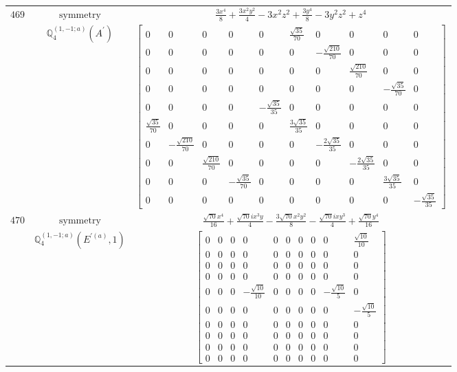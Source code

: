 \documentclass[fleqn,8pt,landscape]{jsarticle}
\begin{document}
\begin{longtable}{ccc}
$ 469 $ & $ \text{symmetry} $ & $ \frac{3 x^{4}}{8} + \frac{3 x^{2} y^{2}}{4} - 3 x^{2} z^{2} + \frac{3 y^{4}}{8} - 3 y^{2} z^{2} + z^{4} $ \\
$  $ & $ \mathbb{Q}_{4}^{(1,-1;a)}(A^{\prime}) $ & $ \begin{bmatrix} 0 & 0 & 0 & 0 & 0 & \frac{\sqrt{35}}{70} & 0 & 0 & 0 & 0 \\ 0 & 0 & 0 & 0 & 0 & 0 & - \frac{\sqrt{210}}{70} & 0 & 0 & 0 \\ 0 & 0 & 0 & 0 & 0 & 0 & 0 & \frac{\sqrt{210}}{70} & 0 & 0 \\ 0 & 0 & 0 & 0 & 0 & 0 & 0 & 0 & - \frac{\sqrt{35}}{70} & 0 \\ 0 & 0 & 0 & 0 & - \frac{\sqrt{35}}{35} & 0 & 0 & 0 & 0 & 0 \\ \frac{\sqrt{35}}{70} & 0 & 0 & 0 & 0 & \frac{3 \sqrt{35}}{35} & 0 & 0 & 0 & 0 \\ 0 & - \frac{\sqrt{210}}{70} & 0 & 0 & 0 & 0 & - \frac{2 \sqrt{35}}{35} & 0 & 0 & 0 \\ 0 & 0 & \frac{\sqrt{210}}{70} & 0 & 0 & 0 & 0 & - \frac{2 \sqrt{35}}{35} & 0 & 0 \\ 0 & 0 & 0 & - \frac{\sqrt{35}}{70} & 0 & 0 & 0 & 0 & \frac{3 \sqrt{35}}{35} & 0 \\ 0 & 0 & 0 & 0 & 0 & 0 & 0 & 0 & 0 & - \frac{\sqrt{35}}{35} \end{bmatrix} $ \\ \hline
$ 470 $ & $ \text{symmetry} $ & $ \frac{\sqrt{70} x^{4}}{16} + \frac{\sqrt{70} i x^{3} y}{4} - \frac{3 \sqrt{70} x^{2} y^{2}}{8} - \frac{\sqrt{70} i x y^{3}}{4} + \frac{\sqrt{70} y^{4}}{16} $ \\
$  $ & $ \mathbb{Q}_{4}^{(1,-1;a)}(E^{\prime(a)},1) $ & $ \begin{bmatrix} 0 & 0 & 0 & 0 & 0 & 0 & 0 & 0 & 0 & \frac{\sqrt{10}}{10} \\ 0 & 0 & 0 & 0 & 0 & 0 & 0 & 0 & 0 & 0 \\ 0 & 0 & 0 & 0 & 0 & 0 & 0 & 0 & 0 & 0 \\ 0 & 0 & 0 & 0 & 0 & 0 & 0 & 0 & 0 & 0 \\ 0 & 0 & 0 & - \frac{\sqrt{10}}{10} & 0 & 0 & 0 & 0 & - \frac{\sqrt{10}}{5} & 0 \\ 0 & 0 & 0 & 0 & 0 & 0 & 0 & 0 & 0 & - \frac{\sqrt{10}}{5} \\ 0 & 0 & 0 & 0 & 0 & 0 & 0 & 0 & 0 & 0 \\ 0 & 0 & 0 & 0 & 0 & 0 & 0 & 0 & 0 & 0 \\ 0 & 0 & 0 & 0 & 0 & 0 & 0 & 0 & 0 & 0 \\ 0 & 0 & 0 & 0 & 0 & 0 & 0 & 0 & 0 & 0 \end{bmatrix} $ \\ \hline

\end{longtable}
\end{document}
